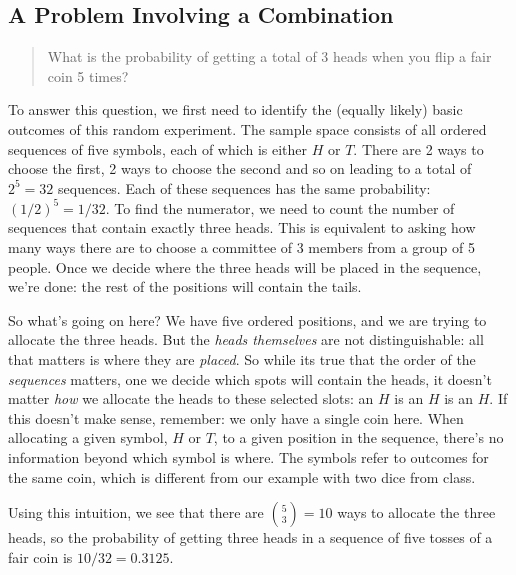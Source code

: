 \documentclass[12pt]{article}
\begin{document}
\subsection*{A Problem Involving a Combination}
\begin{quote}
  What is the probability of getting a total of 3 heads when you flip a fair coin 5 times?
\end{quote}
To answer this question, we first need to identify the (equally likely) basic outcomes of this random experiment.
The sample space consists of all ordered sequences of five symbols, each of which is either $H$ or $T$.
There are 2 ways to choose the first, 2 ways to choose the second and so on leading to a total of $2^{5}=32$ sequences.
Each of these sequences has the same probability: $\left( 1/2 \right)^{5}=1/32$.
To find the numerator, we need to count the number of sequences that contain exactly three heads.
This is equivalent to asking how many ways there are to choose a committee of 3 members from a group of 5 people.
Once we decide where the three heads will be placed in the sequence, we're done: the rest of the positions will contain the tails.

So what's going on here?
We have five ordered positions, and we are trying to allocate the three heads.
But the \emph{heads themselves} are not distinguishable: all that matters is where they are \emph{placed}.
So while its true that the order of the \emph{sequences} matters, one we decide which spots will contain the heads, it doesn't matter \emph{how} we allocate the heads to these selected slots: an $H$ is an $H$ is an $H$.
If this doesn't make sense, remember: we only have a single coin here.
When allocating a given symbol, $H$ or $T$, to a given position in the sequence, there's no information beyond which symbol is where.
The symbols refer to outcomes for the same coin, which is different from our example with two dice from class.

Using this intuition, we see that there are ${5\choose 3}=10$ ways to allocate the three heads, so the probability of getting three heads in a sequence of five tosses of a fair coin is $10/32 = 0.3125$.
\end{document}
